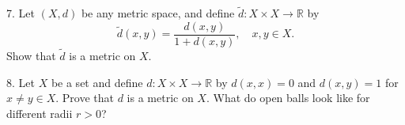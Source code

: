 \documentclass{article}
\theoremstyle{remark} %
\newcommand{\R}{{\mathbb{R}}}
\begin{document}



7. Let $(X,d)$ be any metric space, and define $\tilde d: X \times X \to \R$ by 
    \begin{equation*}
        \tilde d(x,y) = \frac{d(x,y)}{1+d(x,y)}, \quad x,y \in X .
    \end{equation*}
    Show that $\tilde d$ is a metric on $X$.

\vspace{11cm} %



8. Let $X$ be a set and define $d\colon X \times X \to \R$ by $d(x,x) = 0$ and $d(x,y)=1$ for $x\neq y \in X$. Prove that $d$ is a metric on $X$. What do open balls look like for different radii $r>0$? %

\vspace{13cm} %





\end{document}
